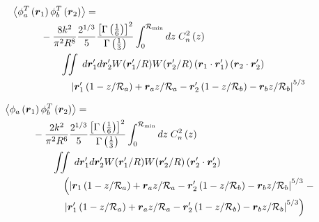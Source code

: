 \begin{equation}\label{tphase_n5}
\begin{aligned}
&\left\langle \phi^{T}_{a}\left(\boldsymbol{r}_{1}\right) \phi^{T}_{b}\left(\boldsymbol{r}_{2}\right)\right\rangle = \\
&\quad\quad\quad
-\frac{8k^{2}}{\pi^{2}R^{8}} 
\frac{2^{1/3}}{5}\frac{\left[\Gamma\left(\frac{1}{6}\right)\right]^{2}}{\Gamma\left(\frac{1}{3}\right)} 
\int_{0}^{\mathcal{R}_{\rm min}} dz\;C_{n}^{2}\left(z\right) \\
&\quad\quad\quad\quad\quad
\iint \; d\boldsymbol{r}^{\prime}_{1}d\boldsymbol{r}^{\prime}_{2} W(\boldsymbol{r}^{\prime}_{1}/R) W(\boldsymbol{r}^{\prime}_{2}/R)
\left(\boldsymbol{r}_{1} \cdot \boldsymbol{r}^{\prime}_{1}\right)
\left(\boldsymbol{r}_{2} \cdot \boldsymbol{r}^{\prime}_{2}\right)
\\
&\quad\quad\quad\quad\quad\quad
\left\vert \boldsymbol{r}^{\prime}_{1}\left(1-z/\mathcal{R}_{a}\right) + \boldsymbol{r}_{a} z/\mathcal{R}_{a} - 
 \boldsymbol{r}^{\prime}_{2}\left(1-z/\mathcal{R}_{b}\right) - \boldsymbol{r}_{b} z/\mathcal{R}_{b}\right\vert^{5/3}
\end{aligned}
\end{equation}

\begin{equation}\label{tprphase_n5}
\begin{aligned}
&\left\langle \phi_{a}\left(\boldsymbol{r}_{1}\right) \phi^{T}_{b}\left(\boldsymbol{r}_{2}\right)\right\rangle = \\
&\quad\quad\quad
-\frac{2k^{2}}{\pi^{2}R^{6}} 
\frac{2^{1/3}}{5}\frac{\left[\Gamma\left(\frac{1}{6}\right)\right]^{2}}{\Gamma\left(\frac{1}{3}\right)} 
\int_{0}^{\mathcal{R}_{\rm min}} dz\;C_{n}^{2}\left(z\right) \\
&\quad\quad\quad\quad\quad
\iint  \; d\boldsymbol{r}^{\prime}_{1}d\boldsymbol{r}^{\prime}_{2} W(\boldsymbol{r}^{\prime}_{1}/R) W(\boldsymbol{r}^{\prime}_{2}/R)
\left(\boldsymbol{r}^{\prime}_{2} \cdot \boldsymbol{r}^{\prime}_{2}\right)
\\
&\quad\quad\quad\quad\quad\quad
\left(
\left\vert \boldsymbol{r}_{1}\left(1-z/\mathcal{R}_{a}\right) + \boldsymbol{r}_{a} z/\mathcal{R}_{a} - \boldsymbol{r}^{\prime}_{2}\left(1-z/\mathcal{R}_{b}\right) - \boldsymbol{r}_{b} z/\mathcal{R}_{b}\right\vert^{5/3}
\right. -
\\
&\quad\quad\quad\quad\quad\quad
\left.
\left\vert \boldsymbol{r}^{\prime}_{1}\left(1-z/\mathcal{R}_{a}\right) + \boldsymbol{r}_{a} z/\mathcal{R}_{a} - 
 \boldsymbol{r}^{\prime}_{2}\left(1-z/\mathcal{R}_{b}\right) - \boldsymbol{r}_{b} z/\mathcal{R}_{b}\right\vert^{5/3}
\right)
\end{aligned}
\end{equation}


